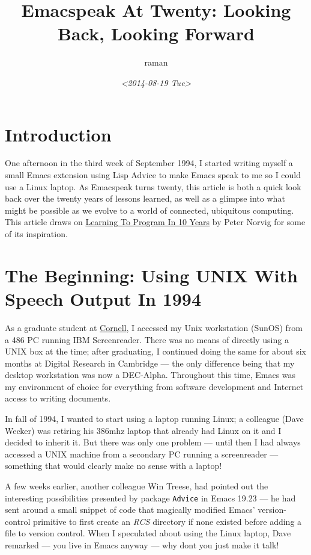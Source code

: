 \documentclass[11pt]{article}
\author{raman}
\date{\textit{<2014-08-19 Tue>}}
\title{Emacspeak At Twenty: Looking Back, Looking Forward}
\begin{document}
\maketitle
\tableofcontents

\section{Introduction}
\label{sec-1}

One afternoon in the third week of September 1994, I started
writing myself a small Emacs extension using Lisp Advice to make
Emacs speak to me so I could use a Linux laptop. As Emacspeak
turns twenty, this article is both a quick look back over the
twenty years of lessons learned, as well as a glimpse into what
might be possible as we evolve to a world of connected,
ubiquitous computing. This article draws on \href{http://norvig.com/21-days.html}{Learning To Program
In 10 Years} by Peter Norvig for some of its inspiration.

\section{The Beginning: Using UNIX With Speech Output In 1994}
\label{sec-2}

As a graduate student at \href{http://www.cs.cornell.edu/info/people/raman/raman.html}{Cornell},  I accessed my Unix workstation
(SunOS) from a 486 PC running IBM Screenreader.  There was no
means of directly using a UNIX box at the time; after graduating,
I continued doing the same for about six months at Digital
Research in Cambridge   —   the only difference being that my
desktop workstation was now a DEC-Alpha. Throughout this time,
Emacs was my environment of choice for everything from software
development and Internet access to writing documents.


In fall of 1994, I wanted to start using a laptop running Linux;
a colleague (Dave Wecker) was retiring his 386mhz laptop that
already had Linux on it and I decided to inherit it. But there
was only one problem   —   until then I had always accessed a UNIX
machine from a secondary PC running a screenreader   —   something
that would clearly make no sense with a laptop!

A few weeks earlier, another colleague Win Treese, had pointed
out the interesting possibilities presented by package \texttt{Advice}
 in Emacs 19.23   —   he had sent around a
small snippet of code that magically modified Emacs'
version-control primitive to first create an \emph{RCS} directory if
none existed before adding a file to version control. When I
speculated about using the Linux laptop, Dave remarked   —   you
live in Emacs anyway   —   why dont you just make it talk!
\end{document}
